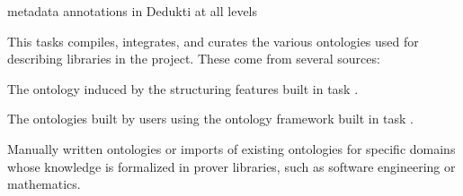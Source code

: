 \begin{workpackage}
\begin{tasklist}
\begin{task}[id=strlibstructure,title=Library Structure,lead=Fau,FauRM=12]
%
%
\end{task} 

\begin{task}[id=strdofimpl,title=Ontological Framework for Meta-Data,lead=Sac,SacRM=18]
metadata annotations in Dedukti at all levels
\end{task} 

\begin{task}[id=strrefonto,title=Reference Ontology,lead=Fau,FauRM=6,SacRM=6]
This tasks compiles, integrates, and curates the various ontologies used for describing libraries in the project.
These come from several sources:
\begin{compactitem}
 \item The ontology induced by the structuring features built in task .
 \item The ontologies built by users using the ontology framework built in task .
 \item Manually written ontologies or imports of existing ontologies for specific domains whose knowledge is formalized in prover libraries, such as software engineering or mathematics.
\end{compactitem}
\end{task} 


\end{tasklist}
\end{workpackage}
